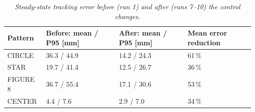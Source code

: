 \begin{table}[H]
\centering
\begin{tabularx}{\textwidth}{|l|X|X|X|}
\hline
\textbf{Pattern} & \textbf{Before: mean / P95 [mm]} & \textbf{After: mean / P95 [mm]} & \textbf{Mean error reduction} \\ \hline
CIRCLE & 36.3 / 44.9 & 14.2 / 24.3 & 61\,\% \\ \hline
STAR & 19.7 / 41.4 & 12.5 / 26.7 & 36\,\% \\ \hline
FIGURE 8 & 36.7 / 55.4 & 17.1 / 30.6 & 53\,\% \\ \hline
CENTER & 4.4 / 7.6 & 2.9 / 7.0 & 34\,\% \\ \hline
\end{tabularx}
\caption{\textit{Steady-state tracking error before (run 1) and after (runs 7--10) the control changes.}}
\label{tab:before_after}
\end{table}
